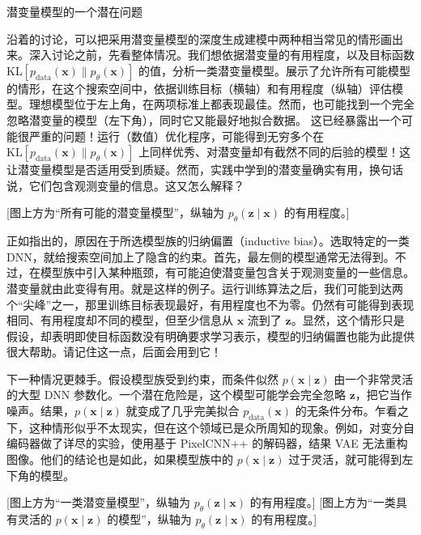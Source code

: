 \medskip\noindent 潜变量模型的一个潜在问题\par\smallskip
沿着的讨论，可以把采用潜变量模型的深度生成建模中两种相当常见的情形画出来。深入讨论之前，先看整体情况。我们想依据潜变量的有用程度，以及目标函数 $\mathrm{KL}[p_{\mathrm{data}}(\mathbf{x})\|p_\theta(\mathbf{x})]$ 的值，分析一类潜变量模型。展示了允许所有可能模型的情形，在这个搜索空间中，依据训练目标（横轴）和有用程度（纵轴）评估模型。理想模型位于左上角，在两项标准上都表现最佳。然而，也可能找到一个完全忽略潜变量的模型（左下角），同时它又能最好地拟合数据。
这已经暴露出一个可能很严重的问题！运行（数值）优化程序，可能得到无穷多个在 $\mathrm{KL}[p_{\mathrm{data}}(\mathbf{x})\|p_\theta(\mathbf{x})]$ 上同样优秀、对潜变量却有截然不同的后验的模型！这让潜变量模型是否适用受到质疑。然而，实践中学到的潜变量确实有用，换句话说，它们包含观测变量的信息。这又怎么解释？

[图上方为“所有可能的潜变量模型”，纵轴为 $p_\theta(\mathbf{z}\mid\mathbf{x})$ 的有用程度。]

正如指出的，原因在于所选模型族的归纳偏置（inductive bias）。选取特定的一类 DNN，就给搜索空间加上了隐含的约束。首先，最左侧的模型通常无法得到。不过，在模型族中引入某种瓶颈，有可能迫使潜变量包含关于观测变量的一些信息。潜变量就由此变得有用。就是这样的例子。运行训练算法之后，我们可能到达两个“尖峰”之一，那里训练目标表现最好，有用程度也不为零。仍然有可能得到表现相同、有用程度却不同的模型，但至少信息从 $\mathbf{x}$ 流到了 $\mathbf{z}$。显然，这个情形只是假设，却表明即使目标函数没有明确要求学习表示，模型的归纳偏置也能为此提供很大帮助。请记住这一点，后面会用到它！

下一种情况更棘手。假设模型族受到约束，而条件似然 $p(\mathbf{x}\mid\mathbf{z})$ 由一个非常灵活的大型 DNN 参数化。一个潜在危险是，这个模型可能学会完全忽略 $\mathbf{z}$，把它当作噪声。结果，$p(\mathbf{x}\mid\mathbf{z})$ 就变成了几乎完美拟合 $p_{\mathrm{data}}(\mathbf{x})$ 的无条件分布。乍看之下，这种情形似乎不太现实，但在这个领域已是众所周知的现象。例如，对变分自编码器做了详尽的实验，使用基于 PixelCNN++ 的解码器，结果 VAE 无法重构图像。他们的结论也是如此，如果模型族中的 $p(\mathbf{x}\mid\mathbf{z})$ 过于灵活，就可能得到左下角的模型。

[图上方为“一类潜变量模型”，纵轴为 $p_\theta(\mathbf{z}\mid\mathbf{x})$ 的有用程度。]
[图上方为“一类具有灵活的 $p(\mathbf{x}\mid\mathbf{z})$ 的模型”，纵轴为 $p_\theta(\mathbf{z}\mid\mathbf{x})$ 的有用程度。]

